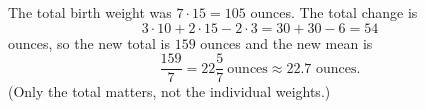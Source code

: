 The total birth weight was $7\cdot15=105$ ounces. The total change is
\[
3\cdot10+2\cdot15-2\cdot3=30+30-6=54
\]
ounces, so the new total is $159$ ounces and the new mean is
\[
\dfrac{159}{7}=\boxed{22\dfrac{5}{7}\ \text{ounces}}\approx22.7\text{ ounces}.
\]
(Only the total matters, not the individual weights.)
